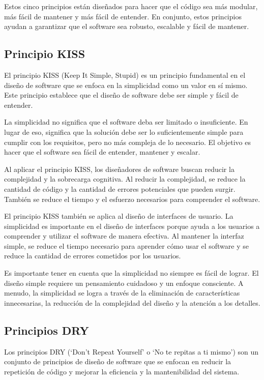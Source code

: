 \documentclass[executivepaper]{article}
\begin{document}
Estos cinco principios están diseñados para hacer que el código sea más modular, más fácil de mantener y más fácil de entender. En conjunto, estos principios ayudan a garantizar que el software sea robusto, escalable y fácil de mantener.

\newpage
\subsection{Principio KISS}
El principio KISS (Keep It Simple, Stupid) es un principio fundamental en el diseño de software que se enfoca en la simplicidad como un valor en sí mismo. Este principio establece que el diseño de software debe ser simple y fácil de entender.

La simplicidad no significa que el software deba ser limitado o insuficiente. En lugar de eso, significa que la solución debe ser lo suficientemente simple para cumplir con los requisitos, pero no más compleja de lo necesario. El objetivo es hacer que el software sea fácil de entender, mantener y escalar.

Al aplicar el principio KISS, los diseñadores de software buscan reducir la complejidad y la sobrecarga cognitiva. Al reducir la complejidad, se reduce la cantidad de código y la cantidad de errores potenciales que pueden surgir. También se reduce el tiempo y el esfuerzo necesarios para comprender el software.

El principio KISS también se aplica al diseño de interfaces de usuario. La simplicidad es importante en el diseño de interfaces porque ayuda a los usuarios a comprender y utilizar el software de manera efectiva. Al mantener la interfaz simple, se reduce el tiempo necesario para aprender cómo usar el software y se reduce la cantidad de errores cometidos por los usuarios.

Es importante tener en cuenta que la simplicidad no siempre es fácil de lograr. El diseño simple requiere un pensamiento cuidadoso y un enfoque consciente. A menudo, la simplicidad se logra a través de la eliminación de características innecesarias, la reducción de la complejidad del diseño y la atención a los detalles.

\newpage
\subsection{Principios DRY}
Los principios DRY (\enquote*{Don't Repeat Yourself} o \enquote*{No te repitas a ti mismo}) son un conjunto de principios de diseño de software que se enfocan en reducir la repetición de código y mejorar la eficiencia y la mantenibilidad del sistema.
\end{document}
